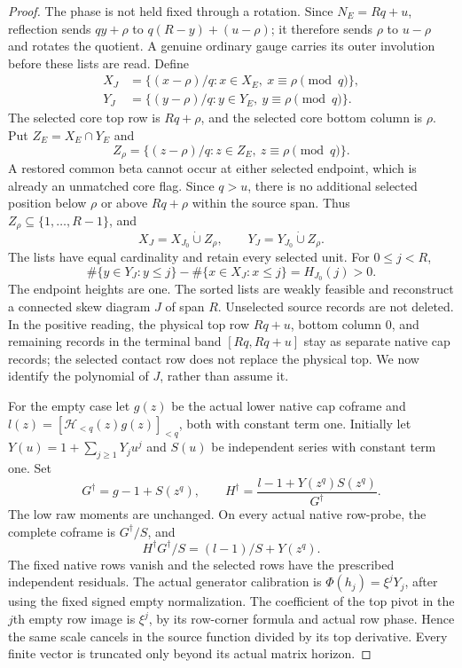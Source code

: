 \documentclass[11pt,a4paper]{amsart}
\numberwithin{equation}{section}
\theoremstyle{plain}
\theoremstyle{definition}
\begin{document}
\begin{proof}
The phase is not held fixed through a rotation.  Since \(N_E=Rq+u\),
reflection sends \(qy+\rho\) to
\(q(R-y)+(u-\rho)\); it therefore sends \(\rho\) to \(u-\rho\)
and rotates the quotient.  A genuine ordinary gauge carries its
outer involution before these lists are read.  Define
\[
 \begin{aligned}
 X_J&=\{(x-\rho)/q:x\in X_E,\ x\equiv\rho\pmod q\},\\
 Y_J&=\{(y-\rho)/q:y\in Y_E,\ y\equiv\rho\pmod q\}.
 \end{aligned}
\]
The selected core top row is \(Rq+\rho\), and the selected core
bottom column is \(\rho\).
Put \(Z_E=X_E\cap Y_E\) and
\[
 Z_\rho=\{(z-\rho)/q:z\in Z_E,\ z\equiv\rho\pmod q\}.
\]
A restored common beta cannot occur at either selected endpoint,
which is already an unmatched core flag.  Since \(q>u\), there is
no additional selected position below \(\rho\) or above \(Rq+\rho\)
within the source span.  Thus \(Z_\rho\subseteq\{1,\ldots,R-1\}\), and
\[
 X_J=X_{J_0}\mathbin{\dot\cup}Z_\rho,\qquad
 Y_J=Y_{J_0}\mathbin{\dot\cup}Z_\rho.
\]
The lists have equal cardinality and retain every selected unit.
For \(0\le j<R\),
\[
 \#\{y\in Y_J:y\le j\}-\#\{x\in X_J:x\le j\}=H_{J_0}(j)>0.
\]
The endpoint heights are one.  The sorted lists are weakly feasible
and reconstruct a connected skew diagram \(J\) of span \(R\).
Unselected source records are not deleted.  In the positive reading,
the physical top row \(Rq+u\), bottom column \(0\), and remaining
records in the terminal band \([Rq,Rq+u]\) stay as separate native
cap records; the selected contact row does not replace the physical
top.  We now identify the polynomial of \(J\), rather than assume it.

For the empty case let \(g(z)\) be the actual lower native cap coframe and
\(l(z)=[\mathcal H_{<q}(z)g(z)]_{<q}\), both with constant term one.
Initially let \(Y(u)=1+\sum_{j\ge1}Y_ju^j\) and \(S(u)\) be independent
series with constant term one.  Set
\begin{equation}\label{eq:empty-section}
 G^\dagger=g-1+S(z^q),\qquad
 H^\dagger=\frac{l-1+Y(z^q)S(z^q)}{G^\dagger}.
\end{equation}
The low raw moments are unchanged.  On every actual native row-probe, the
complete coframe is \(G^\dagger/S\), and
\[
 H^\dagger G^\dagger/S=(l-1)/S+Y(z^q).
\]
The fixed native rows vanish and the selected rows have the prescribed
independent residuals.  The actual generator calibration is
\(\Phi(h_j)=\xi^jY_j\), after using the fixed signed empty normalization.
The coefficient of the top pivot in the \(j\)th empty row image is \(\xi^j\),
by its row-corner formula and actual row phase.  Hence the same scale
cancels in the source function divided by its top derivative.  Every
finite vector is truncated only beyond its actual matrix horizon.


\end{proof}
\end{document}
